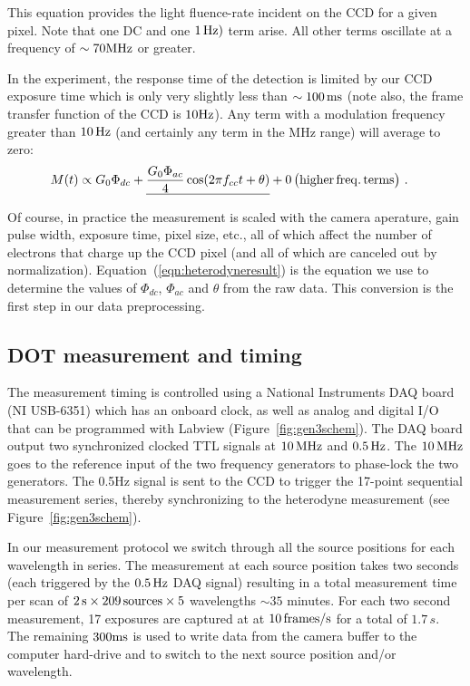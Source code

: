This equation provides the light fluence-rate incident on the CCD for a given pixel. Note that one DC and one $1\,{\rm Hz})$ term arise. All other terms oscillate at a frequency of $\sim 70 {\rm MHz}$ or greater.

In the experiment, the response time of the detection is limited by our CCD exposure time which is only very slightly less than $\sim100\,{\rm ms}$ (note also, the frame transfer function of the CCD is $10 \rm{Hz}$). Any term with a modulation frequency greater than $10\,\rm{Hz}$ (and certainly any term in the MHz range) will average to zero:
\begin{align}
\label{eqn:heterodyneresult}
M(t)
& \propto G_0\Phi_{dc} + \underline{\frac{G_0\Phi_{ac}}{4}\cos(2\pi f_{cc} t+\theta)} + 0\,\big(\rm{higher\,freq.\,terms}\big) \ .
\end{align}

Of course, in practice the measurement is scaled with the camera aperature, gain pulse width, exposure time, pixel size, etc., all of which affect the number of electrons that charge up the CCD pixel (and all of which are canceled out by normalization). Equation~(\ref{eqn:heterodyneresult}) is the equation we use to determine the values of $\Phi_{dc}$, $\Phi_{ac}$ and $\theta$ from the raw data. This conversion is the first step in our data preprocessing.

\subsection{DOT measurement and timing}
The measurement timing is controlled using a National Instruments DAQ board (NI USB-6351) which has an onboard clock, as well as analog and digital I/O that can be programmed with Labview (Figure~\ref{fig:gen3schem}). The DAQ board output two synchronized clocked TTL signals at $10\,{\rm MHz}$ and $0.5\,{\rm Hz}$. The $10\,{\rm MHz}$ goes to the reference input of the two frequency generators to phase-lock the two generators. The 0.5Hz signal is sent to the CCD to trigger the 17-point sequential measurement series, thereby synchronizing to the heterodyne measurement (see Figure~\ref{fig:gen3schem}).

In our measurement protocol we switch through all the source positions for each wavelength in series. The measurement at each source position takes two seconds (each triggered by the $0.5\,{\rm Hz}$ DAQ signal) resulting in a total measurement time per scan of $2\,{\rm s} \times 209\,{\rm sources} \times 5$ wavelengths $\sim 35$ minutes. For each two second measurement, 17 exposures are captured at at $10\,{\rm frames/s}$ for a total of $1.7\,s$. The remaining $300 {\rm ms}$ is used to write data from the camera buffer to the computer hard-drive and to switch to the next source position and/or wavelength.
%
